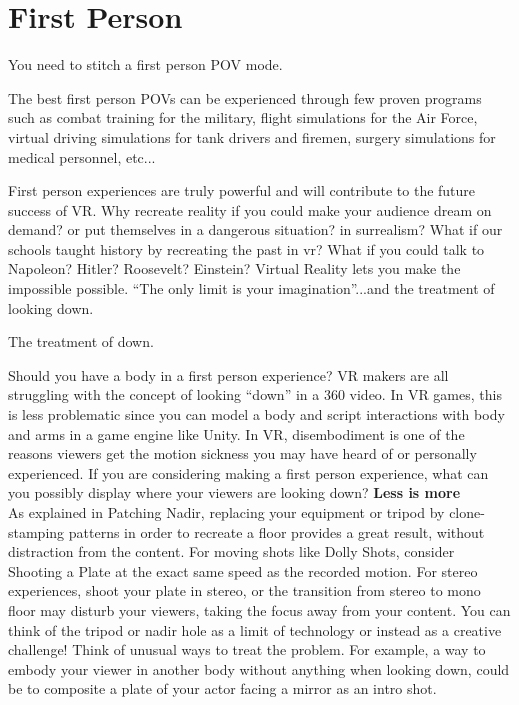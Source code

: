 \chapter{First Person}
\pagecolor{white}
\label{chap:44}
\begin{fullwidth}

\problem

{\large You need to stitch a first person POV mode. \par}

The best first person POVs can be experienced through few proven programs such as combat training for the military, flight simulations for the Air Force, virtual driving simulations for tank drivers and firemen, surgery simulations for medical personnel, etc... 

First person experiences are truly powerful and will contribute to the future success of VR. Why recreate reality if you could make your audience dream on demand? or put themselves in a dangerous situation? in surrealism? What if our schools taught history by recreating the past in vr? What if you could talk to Napoleon? Hitler? Roosevelt? Einstein? Virtual Reality lets you make the impossible possible. “The only limit is your imagination”...and the treatment of looking down.

\solution

{\large The treatment of down. \par}

Should you have a body in a first person experience? VR makers are all struggling with the concept of looking “down” in a 360 video. In VR games, this is less problematic since you can model a body and script interactions with body and arms in a game engine like Unity. In VR, disembodiment is one of the reasons viewers get the motion sickness you may have heard of or personally experienced. If you are considering making a first person experience, what can you possibly display where your viewers are looking down? 
\clearpage
{\bfseries Less is more}
\\
As explained in Patching Nadir, replacing your equipment or tripod by clone-stamping patterns in order to recreate a floor provides a great result, without distraction from the content. For moving shots like Dolly Shots, consider Shooting a Plate at the exact same speed as the recorded motion. For stereo experiences, shoot your plate in stereo, or the transition from stereo to mono floor may disturb your viewers, taking the focus away from your content. You can think of the tripod or nadir hole as a limit of technology or instead as a creative challenge! Think of unusual ways to treat the problem. For example, a way to embody your viewer in another body without anything when looking down, could be to composite a plate of your actor facing a mirror as an intro shot.


\end{fullwidth}
